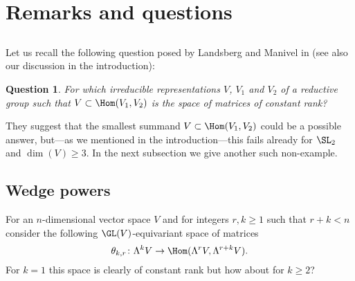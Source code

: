 \documentclass[reqno, 10pt]{amsart}
\theoremstyle{plain}
\newtheorem*{question*}{Question}
\theoremstyle{definition}
\numberwithin{equation}{section}%
\begin{document}
\section{Remarks and questions}\label{section:concluding remarks}
\subsection{}
Let us recall the following question posed by Landsberg and Manivel in \cite[Question 4]{landsberg-manivel} (see also our discussion in the %
introduction):

\begin{question*}	
For which irreducible representations $V$, $V_1$ and $V_2$ of a reductive group such that $V\subset \Hom(V_1,V_2)$ is the space of matrices of constant rank?
\end{question*}

They suggest that the smallest summand $V\subset \Hom(V_1,V_2)$ could be a possible answer, but---as we mentioned in the introduction---this fails already for $\SL_2$ and $\dim(V)\ge 3$.
In the next subsection we give another such non-example.

\subsection{Wedge powers}
For an $n$-dimensional vector space $V$ and for integers $r,k\ge 1$ such that $r+k<n$ consider the following $\GL(V)$-equivariant space of matrices
\[\theta_{k,r}\colon\Lambda^kV\to \Hom(\Lambda^rV, \Lambda^{r+k}V).\]
For $k=1$ this space is clearly of constant rank but how about for $k\ge 2$?
\end{document}
